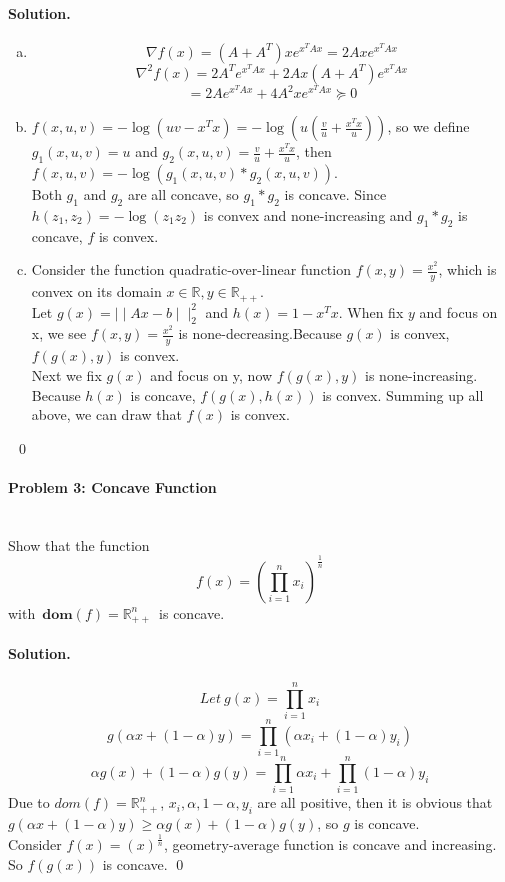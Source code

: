\documentclass[a4paper]{article}
\newenvironment{solution}
{\color{blue} \paragraph{Solution.}}
{\newline \qed}
\begin{document}
\begin{solution}\begin{enumerate}[a)]

    \item $$\nabla f(x) = (A + A^T) x e^{x^T A x} = 2A x e^{x^T A x}$$
            $$\nabla ^2 f(x) = 2 A^T e^{x^T A x} + 2A x (A + A^T) e^{x^T A x}$$
            $$= 2Ae^{x^T A x} + 4A^2 x e^{x^T A x} \succeq 0$$

    \item $f(x,u,v) = - \log (uv - x^T x) = - \log ( u (\frac{v}{u} + \frac{x^T x}{u}))$,
            so we define $g_1 (x,u,v) = u$ and $g_2 (x,u,v) = \frac{v}{u} + \frac{x^T x}{u}$, then
            $f(x,u,v) = -\log (g_1(x,u,v) * g_2(x,u,v))$.\\
            Both $g_1$ and $g_2$ are all concave, so $g_1 * g_2$ is concave. Since $h(z_1 , z_2) = -\log (z_1 z_2)$ is convex and none-increasing and $g_1 * g_2$ is concave, $f$ is convex.

    \item
          Consider the function quadratic-over-linear function $f(x,y) = \frac{x^2}{y}$, which is convex on its domain $x \in \mathbb{R}, y \in \mathbb{R_{++}}$.\\
          Let $g(x) = \mid \mid Ax - b \mid \mid _2 ^2$ and $h(x) = 1 - x^T x$. When fix $y$ and focus on x, we see $f(x,y) = \frac{x^2}{y}$ is none-decreasing.Because $g(x)$ is convex, $f(g(x) , y)$ is convex.\\
          Next we fix $g(x)$ and focus on y, now $f(g(x) , y)$ is none-increasing. Because $h(x)$ is concave, $f(g(x) , h(x))$ is convex. Summing up all above, we can draw that $f(x)$ is convex.

\end{enumerate}
\
\end{solution}


\paragraph{Problem 3: Concave Function}
~\\

Show that the function
\begin{equation*}
    f(x) = \left( \prod^n_{i=1} x_i \right)^{\frac{1}{n}}
\end{equation*}
with~$\textbf{dom}(f) = \mathbb{R}^n_{++}$~is concave.

\begin{solution}
$$Let\ g(x) = \prod^n_{i=1} x_i$$
$$g(\alpha x + (1 - \alpha) y) = \prod _{i = 1} ^n (\alpha x_i + (1 - \alpha) y_i)$$
$$\alpha g(x) + (1 - \alpha)g(y) =  \prod _{i=1}^n\alpha x_i + \prod_{i = 1}^n (1 - \alpha) y_i$$
Due to $dom(f) = \mathbb{R} _{++} ^n$, $x_i , \alpha , 1 - \alpha , y_i$ are all positive, then it is obvious that $g(\alpha x + (1 - \alpha) y) \geq \alpha g(x) + (1 - \alpha)g(y)$, so $g$ is concave.\\
Consider $f(x) = \left( x \right) ^{\frac{1}{n}}$, geometry-average function is concave and increasing. So $f(g(x))$ is concave.
\end{solution}
\end{document}

